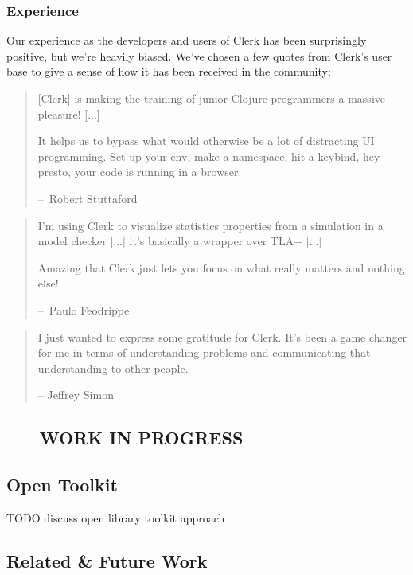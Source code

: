 \documentclass[
]{article}
\begin{document}
\hypertarget{id}{%
\subsubsection{Experience}\label{id}}

Our experience as the developers and users of Clerk has been surprisingly positive, but we're heavily biased. We've chosen a few quotes from Clerk's user base to give a sense of how it has been received in the community:

\begin{quote}
{[}Clerk{]} is making the training of junior Clojure programmers a massive pleasure! {[}...{]}

It helps us to bypass what would otherwise be a lot of distracting UI programming. Set up your env, make a namespace, hit a keybind, hey presto, your code is running in a browser.

--~Robert Stuttaford
\end{quote}

\begin{quote}
I'm using Clerk to visualize statistics properties from a simulation in a model checker {[}...{]} it's basically a wrapper over TLA+ {[}...{]}

Amazing that Clerk just lets you focus on what really matters and nothing else!

--~Paulo Feodrippe
\end{quote}

\begin{quote}
I just wanted to express some gratitude for Clerk. It's been a game changer for me in terms of understanding problems and communicating that understanding to other people.

-- Jeffrey Simon
\end{quote}

\hypertarget{id}{%
\subsection{🚧 🚧 🚧 WORK IN PROGRESS 🚧 🚧 🚧}\label{id}}

\hypertarget{id}{%
\subsection{Open Toolkit}\label{id}}

TODO discuss open library toolkit approach

\hypertarget{id}{%
\subsection{Related \& Future Work}\label{id}}
\end{document}

